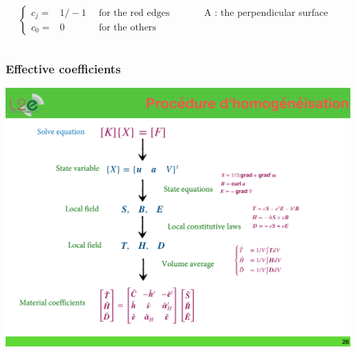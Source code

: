 \documentclass[compress]{beamer}
\begin{document}
\begin{frame}
\begin{equation*}
\end{equation*}
\begin{columns}[totalwidth=\textwidth]
   \begin{column}{.65\textwidth}\vspace*{-\baselineskip}
	\begin{equation*} 
				\left\{ 
				\begin{aligned}
				c_j = & 1/-1 & \enspace \text{for the red edges } \\
				c_0 = & 0 & \enspace \text{for the others }
        		\end{aligned}
				\right.
	\end{equation*}
	\end{column}
	\begin{column}{.30\textwidth}
	A : the perpendicular surface
	\end{column}
\end{columns}
\end{frame}

\begin{frame}\frametitle{Effective coefficients}
\includegraphics[width=0.99\textwidth]{Graphic/04_homoprocedure.pdf}
\end{frame}
\end{document}
